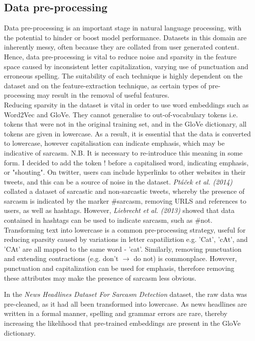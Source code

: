 \documentclass[12pt,a4paper]{article}
\begin{document}
\subsection{Data pre-processing}
\noindent Data pre-processing is an important stage in natural language processing, with the potential to hinder or boost model performance. Datasets in this domain are inherently messy, often because they are collated from user generated content. Hence, data pre-processing is vital to reduce noise and sparsity in the feature space caused by inconsistent letter capitalization, varying use of punctuation and erroneous spelling. The suitability of each technique is highly dependent on the dataset and on the feature-extraction technique, as certain types of pre-processing may result in the removal of useful features. \\
Reducing sparsity in the dataset is vital in order to use word embeddings such as Word2Vec and GloVe. They cannot generalise to out-of-vocabulary tokens i.e. tokens that were not in the original training set, and in the GloVe dictionary, all tokens are given in lowercase. As a result, it is essential that the data is converted to lowercase, however capitalisation can indicate emphasis, which may be indicative of sarcasm. N.B. It is necessary to re-introduce this meaning in some form. I decided to add the token ! before a capitalised word, indicating emphasis, or "shouting". On twitter, users can include hyperlinks to other websites in their tweets, and this can be a source of noise in the dataset. \textit{Pt{\'a}{\v{c}ek et al. (2014)}} \cite{ptavcek2014sarcasm} collated a dataset of sarcastic and non-sarcastic tweets, whereby the presence of sarcasm is indicated by the marker \#sarcasm, removing URLS and references to users, as well as hashtags. However, \textit{Liebrecht et al. (2013)} \cite{liebrecht2013perfect} showed that data contained in hashtags can be used to indicate sarcasm, such as \#not. Transforming text into lowercase is a common pre-processing strategy, useful for reducing sparsity caused by variations in letter capatiliztion e.g. 'Cat', 'cAt', and 'CAt' are all mapped to the same word - 'cat'. Similarly, removing punctuation and extending contractions (e.g. don't $\rightarrow$ do not) is commonplace. However, punctuation and capitalization can be used for emphasis, therefore removing these attributes may make the presence of sarcasm less obvious.

In the \textit{News Headlines Dataset For Sarcasm Detection} dataset, the raw data was pre-cleaned, as it had all been transformed into lowercase. As news headlines are written in a formal manner, spelling and grammar errors are rare, thereby increasing the likelihood that pre-trained embeddings are present in the GloVe dictionary.
\end{document}
